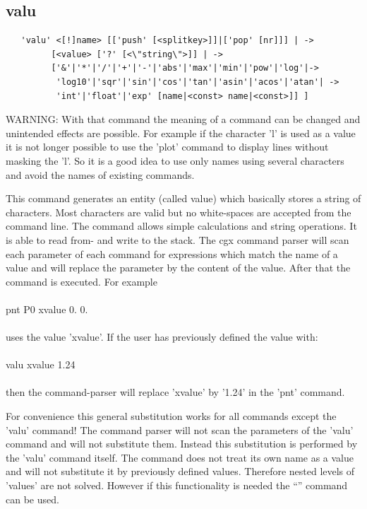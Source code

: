 \documentclass{article}
\begin{document}
\subsection{\label{valu}valu}
\begin{verbatim}
   'valu' <[!]name> [['push' [<splitkey>]]|['pop' [nr]]] | ->
         [<value> ['?' [<\"string\">]] | ->
         ['&'|'*'|'/'|'+'|'-'|'abs'|'max'|'min'|'pow'|'log'|->
          'log10'|'sqr'|'sin'|'cos'|'tan'|'asin'|'acos'|'atan'| ->
          'int'|'float'|'exp' [name|<const> name|<const>]] ]
\end{verbatim}
WARNING: With that command the meaning of a command can be changed and unintended effects are possible. For example if the character 'l' is used as a value it is not longer possible to use the 'plot' command to display lines without masking the 'l'. So it is a good idea to use only names using several characters and avoid the names of existing commands.

This command generates an entity (called value) which basically stores a string of characters. Most characters are valid but no white-spaces are accepted from the command line. The command allows simple calculations and string operations. It is able to read from- and write to the stack.
The cgx command parser will scan each parameter of each command for expressions which match the name of a value and will replace the parameter by the content of the value. After that the command is executed. For example\\\\pnt P0 xvalue 0. 0.\\\\uses the value 'xvalue'. If the user has previously defined the value with:\\\\valu xvalue 1.24\\\\then the command-parser will replace 'xvalue' by '1.24' in the 'pnt' command.

For convenience this general substitution works for all commands except the 'valu' command! The command parser will not scan the parameters of the 'valu' command and will not substitute them. Instead this substitution is performed by the 'valu' command itself. The command does not treat its own name as a value and will not substitute it by previously defined values. Therefore nested levels of 'values' are not solved. However if this functionality is needed the ``'' command can be used.\\\\
\end{document}
